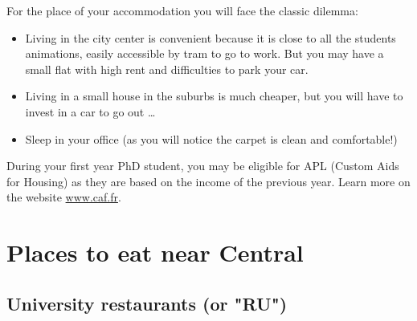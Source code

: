 For the place of your accommodation you will face the classic dilemma:
\begin{itemize}
  \item Living in the city center is convenient because it is close to all the students animations, easily accessible by tram to go to work. But you may have a small flat with high rent and difficulties to park your car.
  \item Living in a small house in the suburbs is much cheaper, but you will have to invest in a car to go out \dots
  \item Sleep in your office (as you will notice the carpet is clean and comfortable!)
\end{itemize}

During your first year PhD student, you may be eligible for APL (Custom Aids for Housing) as they are based on the income of the previous year.
Learn more on the website \url{www.caf.fr}.

\section{Places to eat near Central}

\subsection{University restaurants (or "RU")}


